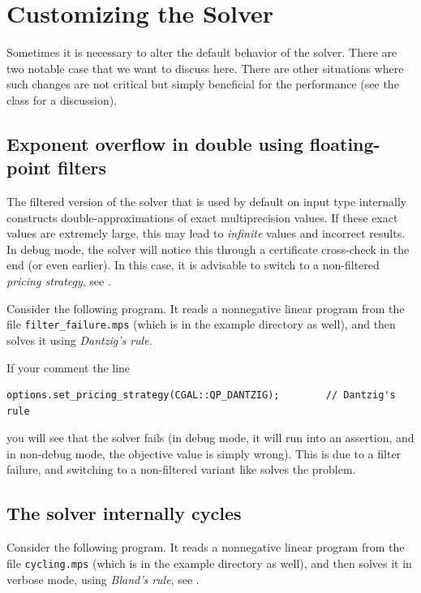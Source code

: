 \section{Customizing the Solver\label{sec:QP-customization}}
Sometimes it is necessary to alter the default behavior of the solver.
There are two notable case that we want to discuss here. There are
other situations where such changes are not critical but simply beneficial
for the performance (see the class 
for a discussion).

\subsection{Exponent overflow in double using floating-point filters\label{sec:QP-customization-filtering}}
The filtered version of the solver that is used by default on input
type  internally constructs double-approximations of exact
multiprecision values. If these exact values are extremely large, this
may lead to \emph{infinite}  values and incorrect results.
In debug mode, the solver will notice this through a certificate 
cross-check in the end (or even earlier). In this case, it is advisable
to switch to a non-filtered \emph{pricing strategy}, see
.

Consider the following program. It reads a nonnegative linear program from
the file \texttt{filter\_failure.mps} (which is in the example directory as 
well), and then solves it using \emph{Dantzig's rule}.


If your comment the line
\begin{verbatim}
options.set_pricing_strategy(CGAL::QP_DANTZIG);        // Dantzig's rule
\end{verbatim}
you will see that the solver fails (in debug mode, it will run into
an assertion, and in non-debug mode, the objective value is simply 
wrong). This is due to a filter failure, and switching to a non-filtered
variant like  solves the problem.

\subsection{The solver internally cycles\label{sec:QP-customization-cycling}}
Consider the following program. It reads a nonnegative linear program from 
the file \texttt{cycling.mps} (which is in the example directory as well),
and then solves it in verbose mode, using \emph{Bland's rule}, see
.

